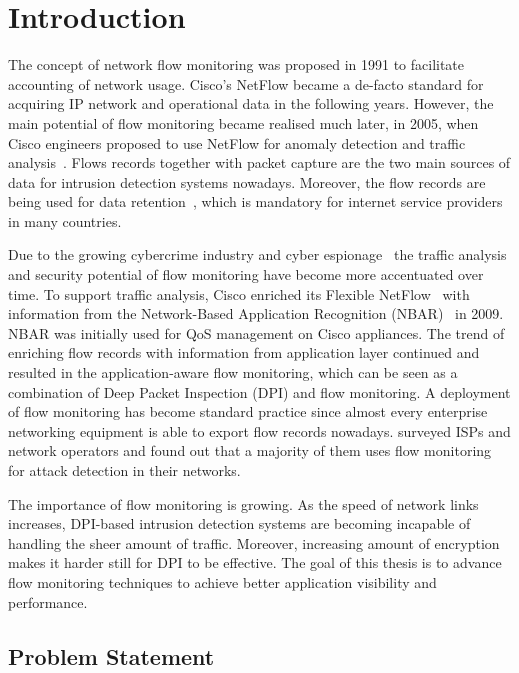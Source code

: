 \chapter{Introduction}

The concept of network flow monitoring was proposed in 1991 to facilitate accounting of network usage. Cisco's NetFlow became a de-facto standard for acquiring IP network and operational data in the following years. However, the main potential of flow monitoring became realised much later, in 2005, when Cisco engineers proposed to use NetFlow for anomaly detection and traffic analysis~\cite{CiscoSystems-2005-Cisco}. Flows records together with packet capture are the two main sources of data for intrusion detection systems nowadays. Moreover, the flow records are being used for data retention~\cite{Wanrooij-2005-Data}, which is mandatory for internet service providers in many countries. 

Due to the growing cybercrime industry and cyber espionage~\cite{CSIS-2013-Economic} the traffic analysis and security potential of flow monitoring have become more accentuated over time. To support traffic analysis, Cisco enriched its Flexible NetFlow~\cite{CiscoSystems-2008-Cisco} with information from the Network-Based Application Recognition (NBAR)~\cite{CiscoSystems--Network} in 2009. NBAR was initially used for QoS management on Cisco appliances. The trend of enriching flow records with information from application layer continued and resulted in the application-aware flow monitoring, which can be seen as a combination of Deep Packet Inspection (DPI) and flow monitoring. A deployment of flow monitoring has become standard practice since almost every enterprise networking equipment is able to export flow records nowadays. \citeauthor{Steinberger-2013-Anomaly} surveyed ISPs and network operators and found out that a majority of them uses flow monitoring for attack detection in their networks.

The importance of flow monitoring is growing. As the speed of network links increases, DPI-based intrusion detection systems are becoming incapable of handling the sheer amount of traffic. Moreover, increasing amount of encryption makes it harder still for DPI to be effective. The goal of this thesis is to advance flow monitoring techniques to achieve better application visibility and performance.

\section{Problem Statement}

